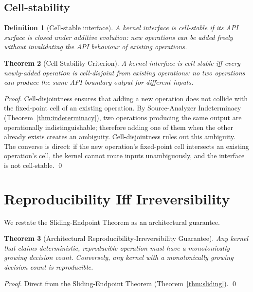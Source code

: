 \documentclass[twocolumn,11pt,a4paper]{article}
\newtheorem{theorem}{Theorem}[section]
\newtheorem{definition}[theorem]{Definition}
\begin{document}
\subsection{Cell-stability}

\begin{definition}[Cell-stable interface]
\label{def:cell-stable}
A kernel interface is \emph{cell-stable} if its API surface is closed under additive evolution: new operations can be added freely without invalidating the API behaviour of existing operations.
\end{definition}

\begin{theorem}[Cell-Stability Criterion]
\label{thm:cell-stability}
A kernel interface is cell-stable iff every newly-added operation is cell-disjoint from existing operations: no two operations can produce the same API-boundary output for different inputs.
\end{theorem}

\begin{proof}
Cell-disjointness ensures that adding a new operation does not collide with the fixed-point cell of an existing operation. By Source-Analyzer Indeterminacy (Theorem~\ref{thm:indeterminacy}), two operations producing the same output are operationally indistinguishable; therefore adding one of them when the other already exists creates an ambiguity. Cell-disjointness rules out this ambiguity. The converse is direct: if the new operation's fixed-point cell intersects an existing operation's cell, the kernel cannot route inputs unambiguously, and the interface is not cell-stable. \qed
\end{proof}

\section{Reproducibility Iff Irreversibility}
\label{sec:rep-iff-irr}

We restate the Sliding-Endpoint Theorem as an architectural guarantee.

\begin{theorem}[Architectural Reproducibility-Irreversibility Guarantee]
\label{thm:guarantee}
Any kernel that claims deterministic, reproducible operation must have a monotonically growing decision count. Conversely, any kernel with a monotonically growing decision count is reproducible.
\end{theorem}

\begin{proof}
Direct from the Sliding-Endpoint Theorem (Theorem~\ref{thm:sliding}). \qed
\end{proof}
\end{document}
